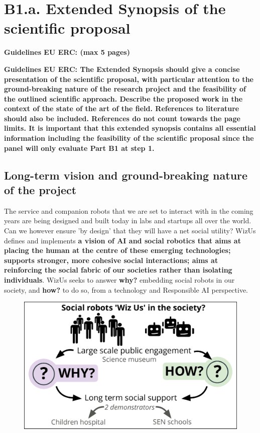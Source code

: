 \documentclass[11pt,a4paper]{report}
\newcommand{\project}{WizUs\xspace}
\newcommand{\eu}[1]{{\color{teal}\textbf{Guidelines EU ERC: #1}}}
\begin{document}

\chapter{B1.a. Extended Synopsis of the scientific proposal}\label{part1}

\eu{(max 5 pages)}

\eu{The Extended Synopsis should give a concise presentation of the scientific
proposal, with particular attention to the ground-breaking nature of the
research project and the feasibility of the outlined scientific approach.
Describe the proposed work in the context of the state of the art of the field.
References to literature should also be included. References do not count
towards the page limits. It is important that this extended synopsis contains
all essential information including the feasibility of the scientific proposal
since the panel will only evaluate Part B1 at step 1.}

\section{Long-term vision and ground-breaking nature of the project}

The service and companion robots that we are set to interact with in the coming
years are being designed and built today in labs and startups all over the
world. Can we however ensure 'by design' that they will have a net social utility?
\project defines and implements \textbf{a vision of AI
and social robotics that aims at placing the human at the centre of these
emerging technologies; supports stronger, more cohesive social interactions;
aims at reinforcing the social fabric of our societies rather than isolating
individuals}. \project seeks to answer \textbf{why?} embedding social robots
in our society, and \textbf{how?} to do so, from a technology and
Responsible AI perspective.

\begin{figure}
    \centering
    \vspace{-7pt}
    \includegraphics[width=\linewidth]{concept}
    \label{fig|concept}
\end{figure}
\end{document}
